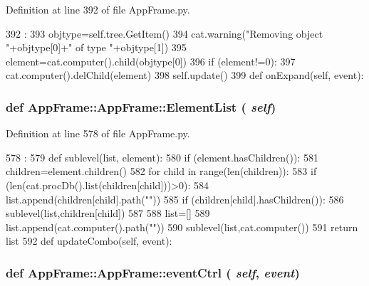 Definition at line 392 of file AppFrame.py.


\begin{DoxyCode}
392                                    :
393         objtype=self.tree.GetItem()
394         cat.warning("Removing object "+objtype[0]+" of type "+objtype[1])
395         element=cat.computer().child(objtype[0])
396         if (element!=0):
397             cat.computer().delChild(element)
398         self.update()
399                         
    def onExpand(self, event):
\end{DoxyCode}
\hypertarget{classAppFrame_1_1AppFrame_a5281ab025cc34273c414c06e58f1507d}{
\subsubsection[{ElementList}]{\setlength{\rightskip}{0pt plus 5cm}def AppFrame::AppFrame::ElementList ( {\em self})}}
\label{classAppFrame_1_1AppFrame_a5281ab025cc34273c414c06e58f1507d}


Definition at line 578 of file AppFrame.py.


\begin{DoxyCode}
578                          :
579         def sublevel(list, element):
580             if (element.hasChildren()):
581                 children=element.children()
582                 for child in range(len(children)):
583                     if (len(cat.procDb().list(children[child]))>0):
584                        list.append(children[child].path(""))
585                     if (children[child].hasChildren()):
586                         sublevel(list,children[child])
587 
588         list=[]
589         list.append(cat.computer().path(""))
590         sublevel(list,cat.computer())
591         return list
592             
    def updateCombo(self, event):
\end{DoxyCode}
\hypertarget{classAppFrame_1_1AppFrame_aca8b90caebbf4467fefc23d134e87882}{
\subsubsection[{eventCtrl}]{\setlength{\rightskip}{0pt plus 5cm}def AppFrame::AppFrame::eventCtrl ( {\em self}, \/   {\em event})}}
\label{classAppFrame_1_1AppFrame_aca8b90caebbf4467fefc23d134e87882}


